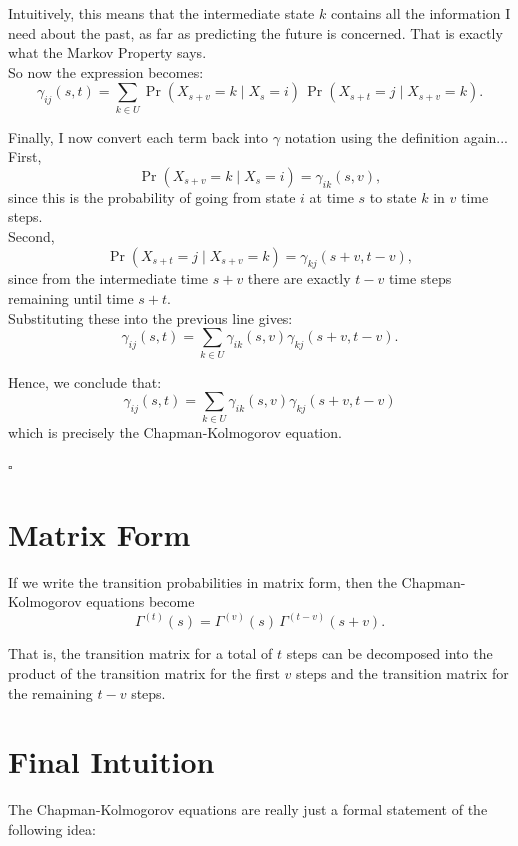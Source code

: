 \documentclass[12pt]{article}
\begin{document}
Intuitively, this means that the intermediate state $k$ contains all the information I need about the past, as far as predicting the future is concerned. That is exactly what the Markov Property says.\\

So now the expression becomes:
\[
\gamma_{ij}(s,t)
=
\sum_{k\in U}
\Pr(X_{s+v}=k\mid X_s=i)\,
\Pr(X_{s+t}=j\mid X_{s+v}=k).
\]

Finally, I now convert each term back into $\gamma$ notation using the definition again...\\

First,
\[
\Pr(X_{s+v}=k\mid X_s=i)=\gamma_{ik}(s,v),
\]
since this is the probability of going from state $i$ at time $s$ to state $k$ in $v$ time steps.\\

Second,
\[
\Pr(X_{s+t}=j\mid X_{s+v}=k)=\gamma_{kj}(s+v,t-v),
\]
since from the intermediate time $s+v$ there are exactly $t-v$ time steps remaining until time $s+t$.\\

Substituting these into the previous line gives:\\
\[
\gamma_{ij}(s,t)
=
\sum_{k\in U}\gamma_{ik}(s,v)\gamma_{kj}(s+v,t-v).
\]

Hence, we conclude that:\\
\[
\boxed{
\gamma_{ij}(s,t)
=
\sum_{k\in U}\gamma_{ik}(s,v)\gamma_{kj}(s+v,t-v)
}
\]
which is precisely the Chapman-Kolmogorov equation.

\hfill $\square$

\section*{Matrix Form}

If we write the transition probabilities in matrix form, then the Chapman-Kolmogorov equations become
\[
\Gamma^{(t)}(s)=\Gamma^{(v)}(s)\,\Gamma^{(t-v)}(s+v).
\]

That is, the transition matrix for a total of $t$ steps can be decomposed into the product of the transition matrix for the first $v$ steps and the transition matrix for the remaining $t-v$ steps.

\section*{Final Intuition}

The Chapman-Kolmogorov equations are really just a formal statement of the following idea:
\end{document}
